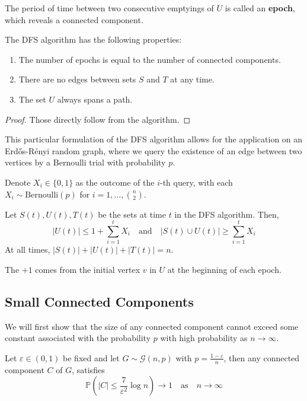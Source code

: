\documentclass{article}
\begin{document}
The period of time between two consecutive emptyings of $U$ is called an \textbf{epoch}, which reveals a connected component.  

\begin{proposition}
    The DFS algorithm has the following properties:
    \begin{enumerate}
        \item The number of epochs is equal to the number of connected components.
        \item There are no edges between sets $S$ and $T$ at any time.
        \item The set $U$ always spans a path.
    \end{enumerate}
\end{proposition}

\begin{proof}
    Those directly follow from the algorithm.
\end{proof}

This particular formulation of the DFS algorithm allows for the application on an Erd\H{o}s-R\'{e}nyi random graph, where we query the existence of an edge between two vertices by a Bernoulli trial with probability $p$.  

Denote $X_i\in \{0,1\}$ as the outcome of the $i$-th query, with each $X_i \sim \text{Bernoulli}(p)$ for $i=1, \ldots, \binom{n}{2}$. 

\begin{proposition}
    Let $S(t), U(t), T(t)$ be the sets at time $t$ in the DFS algorithm. Then, 
    \begin{equation*}
        |U(t)|\leq1+\sum_{i=1}^{t}X_{i} \quad \mathrm{and} \quad |S(t)\cup U(t)|\geq\sum_{i=1}^{t}X_{i}
    \end{equation*}
    At all times, $|S(t)|+|U(t)|+|T(t)|=n$.
\end{proposition}

The $+1$ comes from the initial vertex $v$ in $U$ at the beginning of each epoch. 

\subsection{Small Connected Components}

We will first show that the size of any connected component cannot exceed some constant associated with the probability $p$ with high probability as $n\to \infty$.  

\begin{theorem}\label{thm:small_connected_components}
    Let $\varepsilon \in (0,1)$ be fixed and let $G\sim \mathcal{G}(n,p)$ with $p=\frac{1-\varepsilon}{n}$, then any connected component $C$ of $G$, satisfies
    \begin{equation*}
        \mathbb{P}(|C|\leq \frac{7}{\varepsilon^2}\log n)\to 1 \quad \text{as} \quad n\to \infty
    \end{equation*}
\end{theorem}
\end{document}
